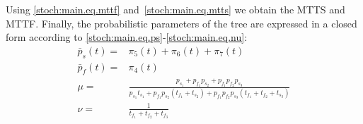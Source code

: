 \begin{example}
Using \eqref{stoch:main.eq.mttf} and~\eqref{stoch:main.eq.mtts} we obtain the MTTS and MTTF. 
Finally, the probabilistic parameters of the tree are expressed in a closed form according to \eqref{stoch:main.eq.ps}-\eqref{stoch:main.eq.nu}:
\begin{eqnarray}
\bar p_s(t)=\!\!\!&\pi_5(t)+\pi_6(t)+\pi_7(t) \\
\bar p_f(t)=\!\!\!&\pi_4(t) \\
\mu=\!\!\!&\frac{p_{s_1}+p_{f_1}p_{s_2}+p_{f_1}p_{f_2}p_{s_3}}{p_{s_1}t_{s_1}+p_{f_1}p_{s_2}(t_{f_1}+t_{s_2})+p_{f_1}p_{f_2}p_{s_3}(t_{f_1}+t_{f_2}+t_{s_3})}\\
\nu=\!\!\!&\frac{1}{t_{f_1}+t_{f_2}+t_{f_3}}
\end{eqnarray}

\end{example}

